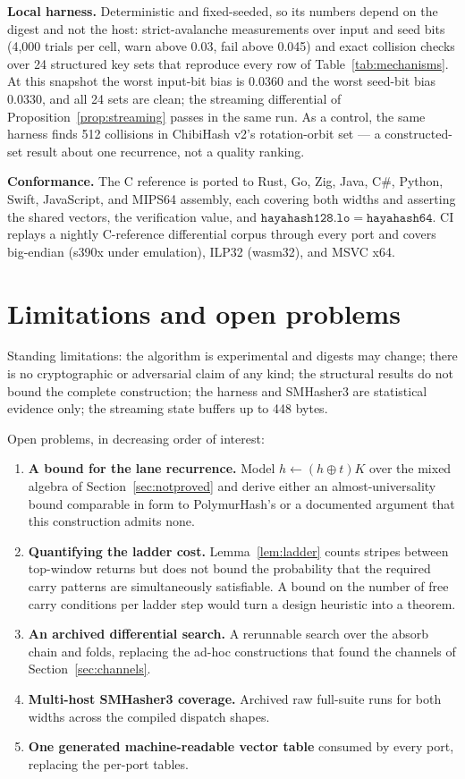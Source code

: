 \documentclass[10pt,a4paper]{article}
\theoremstyle{remark}
\begin{document}
\textbf{Local harness.}  Deterministic and fixed-seeded, so its numbers
depend on the digest and not the host: strict-avalanche measurements over
input and seed bits (4{,}000 trials per cell, warn above 0.03, fail above
0.045) and exact collision checks over 24 structured key sets that reproduce
every row of Table~\ref{tab:mechanisms}.  At this snapshot the worst
input-bit bias is 0.0360 and the worst seed-bit bias 0.0330, and all 24 sets
are clean; the streaming differential of
Proposition~\ref{prop:streaming} passes in the same run.  As a control, the
same harness finds 512 collisions in ChibiHash v2's rotation-orbit set --- a
constructed-set result about one recurrence, not a quality ranking.

\textbf{Conformance.}  The C reference is ported to Rust, Go, Zig, Java,
C\#, Python, Swift, JavaScript, and MIPS64 assembly, each covering both
widths and asserting the shared vectors, the verification value, and
\(\mathtt{hayahash128.lo} = \mathtt{hayahash64}\).  CI replays a nightly
C-reference differential corpus through every port and covers big-endian
(s390x under emulation), ILP32 (wasm32), and MSVC x64.

\section{Limitations and open problems}
\label{sec:limitations}

Standing limitations: the algorithm is experimental and digests may change;
there is no cryptographic or adversarial claim of any kind; the structural
results do not bound the complete construction; the harness and SMHasher3 are
statistical evidence only; the streaming state buffers up to 448 bytes.

Open problems, in decreasing order of interest:

\begin{enumerate}
\item \textbf{A bound for the lane recurrence.}  Model
      \(h \leftarrow (h \oplus t)K\) over the mixed algebra of
      Section~\ref{sec:notproved} and derive either an almost-universality
      bound comparable in form to PolymurHash's
      \cite{peters2023polymurhash} or a documented argument that this
      construction admits none.
\item \textbf{Quantifying the ladder cost.}  Lemma~\ref{lem:ladder} counts
      stripes between top-window returns but does not bound the probability
      that the required carry patterns are simultaneously satisfiable.  A
      bound on the number of free carry conditions per ladder step would turn
      a design heuristic into a theorem.
\item \textbf{An archived differential search.}  A rerunnable search over the
      absorb chain and folds, replacing the ad-hoc constructions that found
      the channels of Section~\ref{sec:channels}.
\item \textbf{Multi-host SMHasher3 coverage.}  Archived raw full-suite runs
      for both widths across the compiled dispatch shapes.
\item \textbf{One generated machine-readable vector table} consumed by every
      port, replacing the per-port tables.
\end{enumerate}
\end{document}
